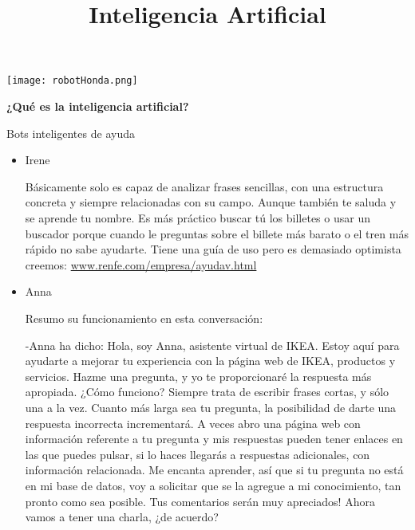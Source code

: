 \documentclass[spanish, a4paper, 12pt]{article} 	%
\begin{document}
\title{\textbf{Inteligencia Artificial}}
\maketitle

\begin{center}
{\texttt{[image: robotHonda.png]}}
\end{center}

\newpage
\textbf{{¿Qué es la inteligencia artificial?}}


\begin{section}{Bots inteligentes de ayuda}

	\begin{itemize}
	
	\item{Irene}
	
	Básicamente solo es capaz de analizar frases sencillas, con una estructura concreta y siempre relacionadas con su campo.
	 Aunque también te saluda y se aprende tu nombre. Es más práctico buscar tú los billetes o usar un buscador porque 
	 cuando le preguntas sobre el billete más barato o el tren más rápido no sabe ayudarte.
	 Tiene una guía de uso pero es demasiado optimista creemos: \url{www.renfe.com/empresa/ayudav.html}
	 
	\item{Anna}
	
	Resumo su funcionamiento en esta conversación:
	
	-Anna ha dicho: Hola, soy Anna, asistente virtual de IKEA. Estoy aquí para ayudarte a mejorar tu experiencia con la página 		web de IKEA, productos y servicios. Hazme una pregunta, y yo te proporcionaré la respuesta más apropiada. 
¿Cómo funciono? Siempre trata de escribir frases cortas, y sólo una a la vez. Cuanto más larga sea tu pregunta, la posibilidad de darte una respuesta incorrecta incrementará. A veces abro una página web con información referente a tu pregunta y mis respuestas pueden tener enlaces en las que puedes pulsar, si lo haces llegarás a respuestas adicionales, con información relacionada. Me encanta aprender, así que si tu pregunta no está en mi base de datos, voy a solicitar que se la agregue a mi conocimiento, tan pronto como sea posible. Tus comentarios serán muy apreciados! Ahora vamos a tener una charla, ¿de acuerdo?


\end{itemize}
\end{section}
\end{document}
